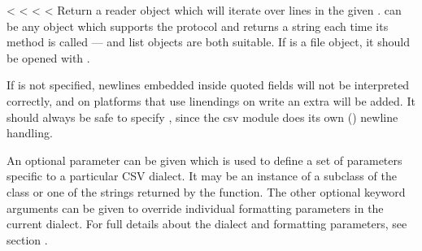 \documentclass[letterpaper,10pt,english]{sphinxmanual}
\begin{document}
\begin{fulllineitems}
\label{\detokenize{csv:csv.reader}}
<%
\pysigstartsignatures
<%
<%
<%
Return a reader object which will iterate over lines in the given .
 can be any object which supports the  protocol and returns a
string each time its  method is called —  and list objects are both suitable.   If  is a file object,
it should be opened with .
\begin{footnote}[1]\sphinxAtStartFootnote
If  is not specified, newlines embedded inside quoted fields
will not be interpreted correctly, and on platforms that use  linendings
on write an extra  will be added.  It should always be safe to specify
, since the csv module does its own
() newline handling.
%
\end{footnote}  An optional
 parameter can be given which is used to define a set of parameters
specific to a particular CSV dialect.  It may be an instance of a subclass of
the {\hyperref[\detokenize{csv:csv.Dialect}]{}} class or one of the strings returned by the
{\hyperref[\detokenize{csv:csv.list_dialects}]{}} function.  The other optional  keyword arguments
can be given to override individual formatting parameters in the current
dialect.  For full details about the dialect and formatting parameters, see
section {\hyperref[\detokenize{csv:csv-fmt-params}]{}}.


\end{fulllineitems}
\end{document}
